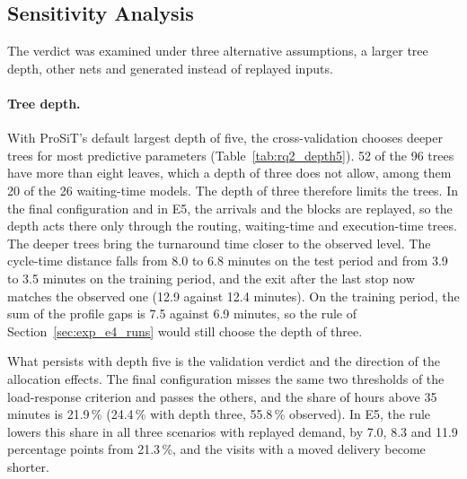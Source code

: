 \subsection{Sensitivity Analysis}
\label{sec:res_e4_sensitivity}
\label{sec:res_e4_depth}
\label{sec:res_e4_nets}

The verdict was examined under three alternative assumptions, a larger tree depth,
other nets and generated instead of replayed inputs.



\paragraph{Tree depth.} With ProSiT's default largest depth of five, the
cross-validation chooses deeper trees for most predictive parameters
(Table~\ref{tab:rq2_depth5}). 52 of the 96 trees have more than eight leaves, which a
depth of three does not allow, among them 20 of the 26 waiting-time models. The depth
of three therefore limits the trees. In the final configuration and in E5, the
arrivals and the blocks are replayed, so the depth acts there only through the
routing, waiting-time and execution-time trees. The deeper trees bring the turnaround
time closer to the observed level.
The cycle-time distance falls from 8.0 to 6.8 minutes on the test period and from
3.9 to 3.5 minutes on the training period, and the exit after the last stop now
matches the observed one (12.9 against 12.4 minutes). On the training period, the
sum of the profile gaps is 7.5 against 6.9 minutes, so the rule of
Section~\ref{sec:exp_e4_runs} would still choose the depth of three.

What persists with depth five is the validation verdict and the direction of the
allocation effects. The final configuration misses the same two thresholds of the load-response
criterion and passes the others, and the share of hours above 35 minutes is 21.9\,\%
(24.4\,\% with depth three, 55.8\,\% observed). In E5, the rule lowers this share in
all three scenarios with replayed demand, by 7.0, 8.3 and 11.9 percentage points from
21.3\,\%, and the visits with a moved delivery become shorter.

